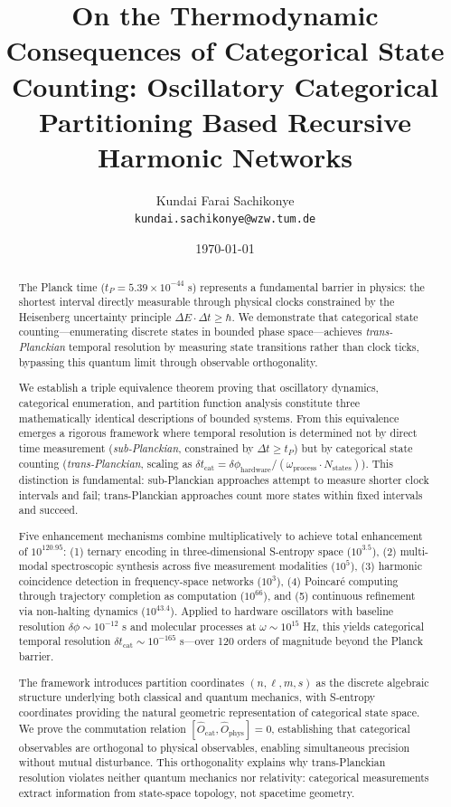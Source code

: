 \documentclass[twocolumn,10pt]{article}
\title{On the Thermodynamic Consequences of Categorical State Counting: Oscillatory Categorical Partitioning Based Recursive Harmonic Networks}
\author{
    Kundai Farai Sachikonye\\
    \texttt{kundai.sachikonye@wzw.tum.de}
}
\date{\today}
\theoremstyle{remark}
\begin{document}
\maketitle

\begin{abstract}
The Planck time ($t_P = 5.39 \times 10^{-44}$ s) represents a fundamental barrier in physics: the shortest interval directly measurable through physical clocks constrained by the Heisenberg uncertainty principle $\Delta E \cdot \Delta t \geq \hbar$. We demonstrate that categorical state counting—enumerating discrete states in bounded phase space—achieves \textit{trans-Planckian} temporal resolution by measuring state transitions rather than clock ticks, bypassing this quantum limit through observable orthogonality.

We establish a triple equivalence theorem proving that oscillatory dynamics, categorical enumeration, and partition function analysis constitute three mathematically identical descriptions of bounded systems. From this equivalence emerges a rigorous framework where temporal resolution is determined not by direct time measurement (\textit{sub-Planckian}, constrained by $\Delta t \geq t_P$) but by categorical state counting (\textit{trans-Planckian}, scaling as $\delta t_{\text{cat}} = \delta\phi_{\text{hardware}}/(\omega_{\text{process}} \cdot N_{\text{states}})$). This distinction is fundamental: sub-Planckian approaches attempt to measure shorter clock intervals and fail; trans-Planckian approaches count more states within fixed intervals and succeed.

Five enhancement mechanisms combine multiplicatively to achieve total enhancement of $10^{120.95}$: (1) ternary encoding in three-dimensional S-entropy space ($10^{3.5}$), (2) multi-modal spectroscopic synthesis across five measurement modalities ($10^{5}$), (3) harmonic coincidence detection in frequency-space networks ($10^{3}$), (4) Poincaré computing through trajectory completion as computation ($10^{66}$), and (5) continuous refinement via non-halting dynamics ($10^{43.4}$). Applied to hardware oscillators with baseline resolution $\delta\phi \sim 10^{-12}$ s and molecular processes at $\omega \sim 10^{15}$ Hz, this yields categorical temporal resolution $\delta t_{\text{cat}} \sim 10^{-165}$ s—over 120 orders of magnitude beyond the Planck barrier.

The framework introduces partition coordinates $(n, \ell, m, s)$ as the discrete algebraic structure underlying both classical and quantum mechanics, with S-entropy coordinates providing the natural geometric representation of categorical state space. We prove the commutation relation $[\hat{O}_{\text{cat}}, \hat{O}_{\text{phys}}] = 0$, establishing that categorical observables are orthogonal to physical observables, enabling simultaneous precision without mutual disturbance. This orthogonality explains why trans-Planckian resolution violates neither quantum mechanics nor relativity: categorical measurements extract information from state-space topology, not spacetime geometry.


\end{abstract}
\end{document}
